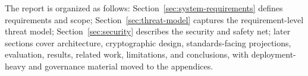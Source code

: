 The report is organized as follows: Section~\ref{sec:system-requirements} defines requirements and scope; Section~\ref{sec:threat-model} captures the requirement-level threat model; Section~\ref{sec:security} describes the security and safety net; later sections cover architecture, cryptographic design, standards-facing projections, evaluation, results, related work, limitations, and conclusions, with deployment-heavy and governance material moved to the appendices.


